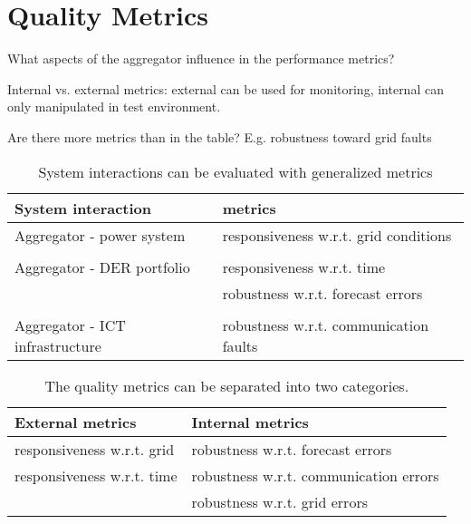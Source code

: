 \section{Quality Metrics}

What aspects of the aggregator influence in the performance metrics?

Internal vs. external metrics: external can be used for monitoring, internal can only manipulated in test environment.

Are there more metrics than in the table? E.g. robustness toward grid faults

\begin{table}[!t]%
\renewcommand{\arraystretch}{1.3}
\caption{System interactions can be evaluated with generalized metrics}
\label{tab:metrics}
\centering
\begin{tabular}{ll}
\toprule
System interaction & metrics\\
\midrule
Aggregator - power system & responsiveness w.r.t. grid conditions\\
\\
Aggregator - DER portfolio & responsiveness w.r.t. time\\
 & robustness w.r.t. forecast errors\\
 \\
Aggregator -  ICT infrastructure & robustness w.r.t. communication faults\\
\bottomrule
\end{tabular}
\end{table}

\begin{table}[!t]
\renewcommand{\arraystretch}{1.3}
\caption{The quality metrics can be separated into two categories.}
\label{tab:metricsclass}
\centering
\begin{tabular}{ll}
\toprule
External metrics & Internal metrics\\
\midrule
responsiveness w.r.t. grid &robustness w.r.t. forecast errors\\
responsiveness w.r.t. time & robustness w.r.t. communication errors\\
& robustness w.r.t. grid errors\\
\bottomrule
\end{tabular}
\end{table}